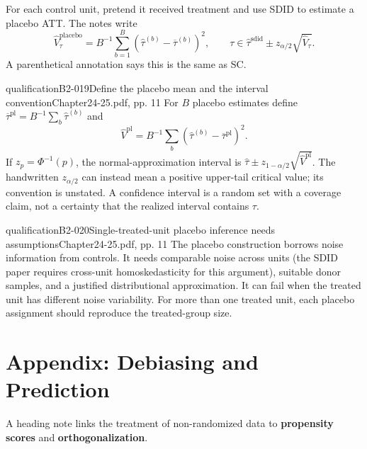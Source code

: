 For each control unit, pretend it received treatment and use SDID to estimate a placebo ATT. The notes write
\[
\widehat V_{\tau}^{\mathrm{placebo}}
=B^{-1}\sum_{b=1}^{B}
\left(\widehat\tau^{(b)}-\overline\tau^{(b)}\right)^2,
\qquad
\tau\in\widehat\tau^{\mathrm{sdid}}
\pm z_{\alpha/2}\sqrt{\widehat V_\tau}.
\]
 A parenthetical annotation says this is the same as SC.
\begin{reviewnote}{qualification}{B2-019}{Define the placebo mean and the interval convention}{Chapter24-25.pdf, pp. 11}
For \(B\) placebo estimates define \(\overline\tau^{\mathrm{pl}}=B^{-1}\sum_b\widehat\tau^{(b)}\) and
\[
\widehat V^{\mathrm{pl}}=B^{-1}\sum_b(\widehat\tau^{(b)}-\overline\tau^{\mathrm{pl}})^2.
\]
If \(z_p=\Phi^{-1}(p)\), the normal-approximation interval is \(\widehat\tau\pm z_{1-\alpha/2}\sqrt{\widehat V^{\mathrm{pl}}}\). The handwritten \(z_{\alpha/2}\) can instead mean a positive upper-tail critical value; its convention is unstated. A confidence interval is a random set with a coverage claim, not a certainty that the realized interval contains \(\tau\).
\par{}
\end{reviewnote}
\begin{reviewnote}{qualification}{B2-020}{Single-treated-unit placebo inference needs assumptions}{Chapter24-25.pdf, pp. 11}
The placebo construction borrows noise information from controls. It needs comparable noise across units (the SDID paper requires cross-unit homoskedasticity for this argument), suitable donor samples, and a justified distributional approximation. It can fail when the treated unit has different noise variability. For more than one treated unit, each placebo assignment should reproduce the treated-group size.
\par{}
\end{reviewnote}


\section{Appendix: Debiasing and Prediction}
A heading note links the treatment of non-randomized data to \textbf{propensity scores} and \textbf{orthogonalization}.
